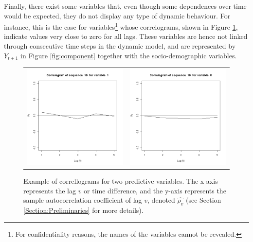 Finally, there exist some variables that, even though some dependences over time would be expected, they do not display any type of dynamic behaviour. For instance, this is the case for variables\footnote{For confidentiality reasons, the names of the variables cannot be revealed.} whose correlograms, shown in Figure \ref{fig:cajamarCorr}, indicate values very close to zero for all lags. These variables are hence not linked through consecutive time steps in the dynamic model, and are represented by $Y_{t+1}$ in Figure \ref{fig:component} together with the socio-demographic variables.

\begin{figure}[h]
  \centering
    \begin{tabular}{cc}
    \includegraphics[width=70mm]{figures/CajaMarcrl1}&
     \includegraphics[width=70mm]{figures/CajaMarcrl3}\\
  \end{tabular}
    \caption{\label{fig:cajamarCorr}Example of correllograms for two predictive variables.  The x-axis represents the lag $v$ or time difference, and the y-axis represents the sample autocorrelation coefficient of lag $v$, denoted $\hat{\rho_v}$ (see Section \ref{Section:Preliminaries} for more details).}
\end{figure}


